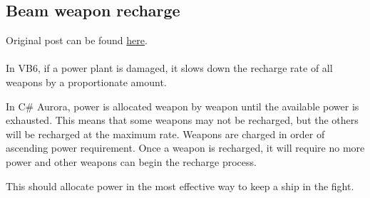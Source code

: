 \documentclass[../../Aurora C# unofficial manual.tex]{subfiles}
\begin{document}
	\subsection{Beam weapon recharge}
	Original post can be found
	\href{http://aurora2.pentarch.org/index.php?topic=8495.msg103586#msg103586}{here}.
	\\\\
	
	In VB6, if a power plant is damaged, it slows down the recharge rate of all weapons by a proportionate amount.
	
	In C\# Aurora, power is allocated weapon by weapon until the available power is exhausted. This means that some weapons may not be recharged, but the others will be recharged at the maximum rate. Weapons are charged in order of ascending power requirement. Once a weapon is recharged, it will require no more power and other weapons can begin the recharge process.
	
	This should allocate power in the most effective way to keep a ship in the fight.
\end{document}
